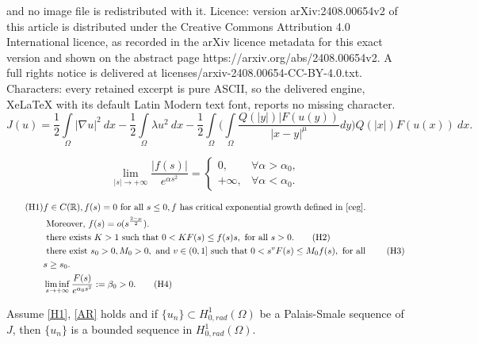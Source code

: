 \documentclass[10pt,a4paper]{amsart}
\newcommand{\R}{\mathbb{R}}
\newcommand{\hr}{H^1_{0, rad}(\Omega)}
\begin{document}
and no image file is redistributed with it. Licence: version arXiv:2408.00654v2 of this article is distributed under the Creative Commons Attribution 4.0 International licence, as recorded in the arXiv licence metadata for this exact version and shown on the abstract page https://arxiv.org/abs/2408.00654v2. A full rights notice is delivered at licenses/arxiv-2408.00654-CC-BY-4.0.txt. Characters: every retained excerpt is pure ASCII, so the delivered engine, XeLaTeX with its default Latin Modern text font, reports no missing character.
	\begin{equation}
		\label{J}
		J(u) = \frac{1}{2} \int\limits_\Omega |\nabla u|^2 \ dx - \frac{1}{2}\int\limits_\Omega \lambda u^2 \ dx -\frac{1}{2} \int\limits_\Omega \Bigg( \int\limits_\Omega \frac{Q(|y|)|F(u(y))}{|x-y|^{\mu}}dy \Bigg) Q(|x|)F(u(x)) \ dx.
	\end{equation}  

	\begin{equation} 
		\label{ceg}
		\lim_{|s| \rightarrow +\infty} \frac{|f(s)|}{e^{\alpha s^2}}=\begin{cases}
			0,& \forall \alpha > \alpha_0,\\
			+\infty, & \forall \alpha < \alpha_0.
		\end{cases}
	\end{equation}

	\begin{align} 
		\label{H1} \tag{H1} 
		&f\in C(\R), f(s)=0 \text{ for all } s\leq 0, f \text{ has critical exponential growth defined in \eqref{ceg}. }  \\
		&\text{  Moreover, } f(s)= o(s^{\frac{2 - \mu}{2}}). \nonumber\\
		&\text{ there exists }  K > 1 \text{ such that }  0< K F(s) \leq f(s) s , \text{ for all } s >0. \label{AR} \tag{H2}\\
		&\text{ there exist }  s_0 > 0 ,  M_0 > 0, \text{ and }  v \in (0, 1] \text{ such that }  0 < s^v F(s) \leq M_0 f(s),\text{ for all }\label{d} \tag{H3}\\ 
		&  s \geq s_0 .\nonumber\\
		&\liminf_{s\rightarrow + \infty} \frac{F(s)}{e^{\alpha_0s^2}} := \beta_0 >0. \tag{H4} \label{H4} 
	\end{align}

	\begin{lem}
		\label{lem3.1}
		Assume \eqref{H1}, \eqref{AR} holds and if $\{ u_n\} \subset \hr $ be a Palais-Smale sequence of $J$, then $\{u_n\}$ is a bounded sequence in $\hr$.
	\end{lem}
\end{document}
